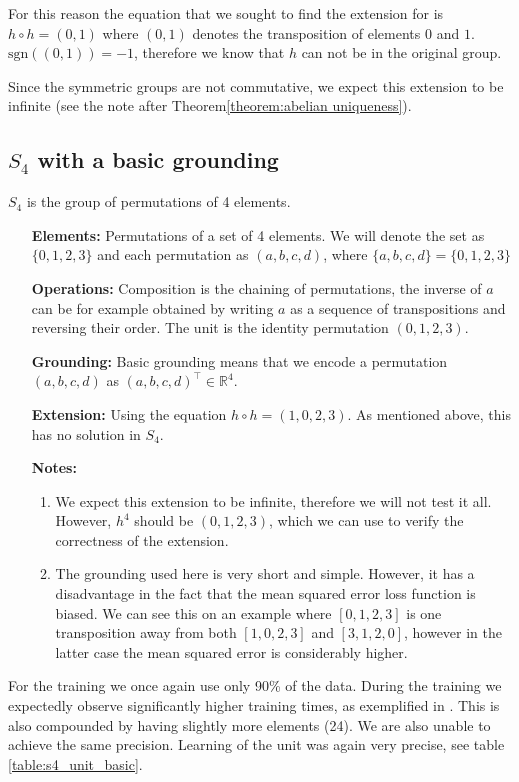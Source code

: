 For this reason the equation that we sought to find the extension for is $h\circ h=(0,1)$ where $(0,1)$ denotes the transposition of elements $0$ and $1$. $\text{sgn}((0,1))=-1$, therefore we know that $h$ can not be in the original group. 

Since the symmetric groups are not commutative, we expect this extension to be infinite (see the note after Theorem\autoref{theorem:abelian uniqueness}).

\subsection{$S_4$ with a basic grounding}
$S_4$ is the group of permutations of 4 elements. 

\begin{itemize}
	\item[\textbf{Elements:}] Permutations of a set of 4 elements. We will denote the set as $\{0,1,2,3\}$ and each permutation as $(a,b,c,d)$, where $\{a,b,c,d\}=\{0,1,2,3\}$
	\item[\textbf{Operations:}] Composition is the chaining of permutations, the inverse  of $a$ can be for example obtained by writing $a$ as a sequence of transpositions and reversing their order. The unit is the identity permutation $(0,1,2,3)$.
	\item[\textbf{Grounding:}] Basic grounding means that we encode a permutation $(a,b,c,d)$ as $(a,b,c,d)^\top \in \mathbb{R}^4$.
	\item[\textbf{Extension:}] Using the equation $h\circ h=(1,0,2,3)$. As mentioned above, this has no solution in $S_4$.
	\item[\textbf{Notes:}] 
	\begin{enumerate}
		\item We expect this extension to be infinite, therefore we will not test it all. However, $h^4$ should be $(0,1,2,3)$, which we can use to verify the correctness of the extension.
	
	\item The grounding used here is very short and simple. However, it has a disadvantage in the fact that the mean squared error loss function is biased. We can see this on an example where $[0,1,2,3]$ is one transposition away from both $[1,0,2,3]$ and $[3,1,2,0]$, however in the latter case the mean squared error is considerably higher.
	\end{enumerate}
\end{itemize}


For the training we once again use only 90\% of the data. During the training we expectedly observe significantly higher training times, as exemplified in . This is also compounded by having slightly more elements (24). We are also unable to achieve the same precision. Learning of the unit was again very precise, see table \ref{table:s4_unit_basic}.

